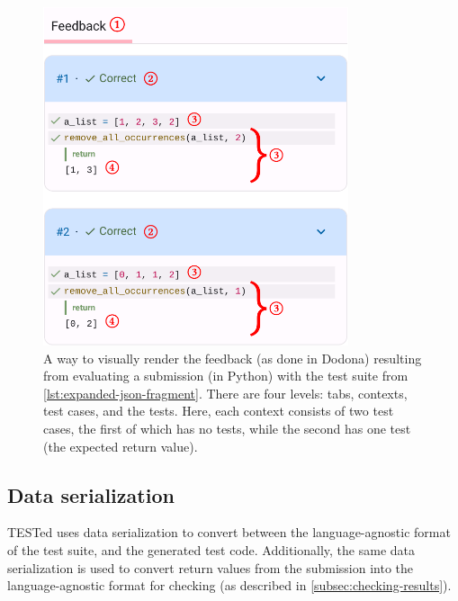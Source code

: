 \documentclass[../main]{subfiles}
\begin{document}
\begin{figure}
    \centering
    \includegraphics[width=0.8\textwidth]{dodona-rendering}
    \caption{A way to visually render the feedback (as done in Dodona) resulting from evaluating a submission (in Python) with the test suite from \cref{lst:expanded-json-fragment}.
    There are four levels:  tabs,  contexts,  test cases, and  the tests.
    Here, each context consists of two test cases, the first of which has no tests, while the second has one test (the expected return value).}
    \label{fig:dodona}
\end{figure}

\subsection{Data serialization}\label{subsec:data-serialization}

TESTed uses data serialization to convert between the language-agnostic format of the test suite, and the generated test code.
Additionally, the same data serialization is used to convert return values from the submission into the language-agnostic format for checking (as described in \cref{subsec:checking-results}).
\end{document}
